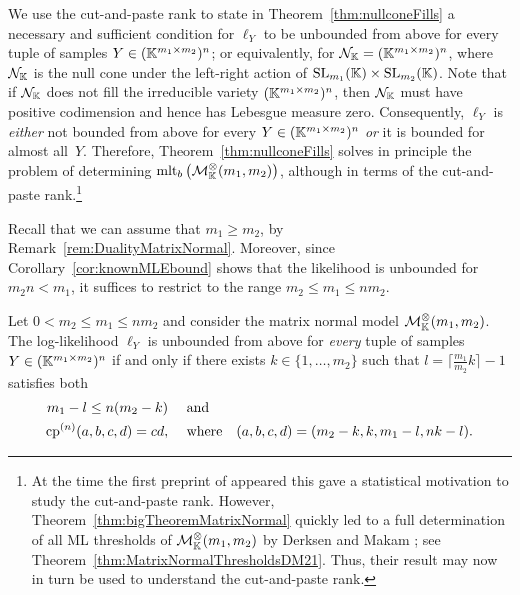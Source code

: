 We use the cut-and-paste rank to state in Theorem~\ref{thm:nullconeFills} a necessary and sufficient condition for $\ell_Y$ to be unbounded from above for every tuple of samples $Y \in (\mathbb K^{m_1 \times m_2})^n$; or equivalently, for $\mathcal{N}_\mathbb K = (\mathbb K^{m_1 \times m_2})^n$, where $\mathcal{N}_\mathbb K$ is the null cone under the left-right action of $\operatorname{SL}_{m_1}(\mathbb K) \times \operatorname{SL}_{m_2}(\mathbb K)$. Note that if $\mathcal{N}_\mathbb K$ does not fill the irreducible variety $(\mathbb K^{m_1 \times m_2})^n$, then $\mathcal{N}_\mathbb K$ must have positive codimension and hence has Lebesgue measure zero.
Consequently, $\ell_Y$ is \emph{either} not bounded from above for every $Y \in (\mathbb K^{m_1 \times m_2})^n$ \emph{or} it is bounded for almost all~$Y$.
Therefore, Theorem~\ref{thm:nullconeFills} solves in principle the problem of determining $\operatorname{mlt}_b \big( \mathcal{M}^{\otimes}_{\mathbb{K}}(m_1,m_2) \big)$, although in terms of the cut-and-paste rank.\footnote{At the time the first preprint of \cite{SiagaPaper} appeared this gave a statistical motivation to study the cut-and-paste rank. However, Theorem~\ref{thm:bigTheoremMatrixNormal} quickly led to a full determination of all ML thresholds of $\mathcal{M}^{\otimes}_{\mathbb{K}}(m_1,m_2)$ by Derksen and Makam \cite[Theorem~1.3]{DM21MatrixNormal}; see Theorem~\ref{thm:MatrixNormalThresholdsDM21}. Thus, their result may now in turn be used to understand the cut-and-paste rank.}

Recall that we can assume that $m_1 \geq m_2$, by Remark~\ref{rem:DualityMatrixNormal}. Moreover, since Corollary~\ref{cor:knownMLEbound} shows that the likelihood is unbounded for $m_2 n < m_1$, it suffices to restrict to the range $m_2 \leq m_1 \leq n m_2$.

\begin{theorem}
	\label{thm:nullconeFills}
	Let $0 < m_2 \leq m_1 \leq n m_2$ and consider the matrix normal model $\mathcal{M}^{\otimes}_{\mathbb{K}}(m_1,m_2)$.
	The log-likelihood $\ell_Y$ is unbounded from above for \emph{every} tuple of samples $Y \in (\mathbb K^{m_1 \times m_2})^n$
	if and only if there exists $k \in \{ 1, \ldots, m_2\}$ such that $l = \lceil \frac{m_1}{m_2} k \rceil - 1$ satisfies both
	\begin{align*}
		m_1-l \leq n(m_2-k) \quad &\text{ and}   \\
		\operatorname{cp}^{(n)}(a,b,c,d) = cd, \quad  &\text{ where} \quad
		(a,b,c,d) = (m_2-k,k,m_1-l,nk-l).
	\end{align*}
\end{theorem}

